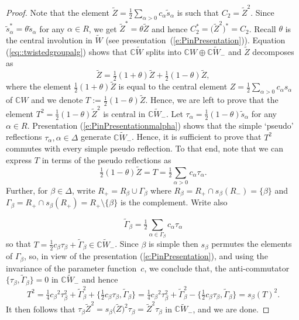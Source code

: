\documentclass[pdftex]{sigma}
\numberwithin{equation}{section}
\begin{document}
\begin{proof}
Note that the element
$\tilde{Z} = \frac{1}{2} \sum_{\alpha >0} c_\alpha \tilde{s}_\alpha$ is such that $C_2 = \tilde{Z}^2$. Since $\tilde{s}_\alpha^* = \theta\tilde{s}_\alpha$ for any $\alpha\in R$, we get $\tilde{Z}^*=\theta\tilde{Z}$ and hence $C_2^* = \big(\tilde{Z}^2\big)^* = C_2$. Recall $\theta$ is the central involution in $\tilde{W}$ (see presentation~(\ref{e:PinPresentation})).
Equation (\ref{eq::twistedgroupalg}) shows that $\mathbb{C}\tilde{W}$ splits into $\mathbb{C}W \oplus \mathbb{C}\tilde{W}_-$ and $\tilde{Z}$ decomposes as
\[\tilde{Z} = \tfrac{1}{2}(1+\theta) \tilde{Z} + \tfrac{1}{2}(1-\theta) \tilde{Z},\]
where the element $ \frac{1}{2}(1
+\theta) \tilde{Z}$ is equal to the central element $Z = \frac{1}{2}\sum_{\alpha >0}c_\alpha s_\alpha$ of $ \mathbb{C}W$ and we denote $T:=\tfrac{1}{2}(1-\theta) \tilde{Z}$. Hence, we are left to prove that the element $T^2= \frac{1}{2}(1-\theta) \tilde{Z}^2$ is central in $\mathbb{C}\tilde{W}_-$. Let $\tau_\alpha = \frac{1}{2}(1-\theta)\tilde{s}_\alpha$ for any $\alpha \in R$. Presentation (\ref{e:PinPresentationmalpha}) shows that the simple `pseudo' reflections $\tau_\alpha, \alpha \in \Delta$ generate $\mathbb{C}\tilde{W}_-$. Hence, it is sufficient to prove that $T^2$ commutes with every simple pseudo reflection. To that end, note that we can express $T$ in terms of the pseudo reflections as
\[\tfrac{1}{2}(1-\theta) \tilde{Z} = T = \tfrac{1}{2}\sum_{\alpha >0} c_\alpha \tau_\alpha.
\]
Further, for $\beta \in \Delta$, write $R_+ = R_\beta \cup \Gamma_\beta$ where $R_\beta = R_+\cap s_\beta(R_-) = \{\beta\}$ and $\Gamma_\beta = R_+\cap s_\beta(R_+) = R_+ \setminus \{\beta\}$ is the complement. Write also

\begin{equation}\label{e:tildeZsums}
\tilde{\Gamma}_\beta = \tfrac{1}{2} \sum_{\alpha \in \Gamma_\beta} c_\alpha \tau_\alpha
\end{equation}
so that $T = \frac{1}{2}c_\beta \tau_\beta + \tilde{\Gamma}_\beta \in \mathbb{C} \tilde{W}_-$.
Since $\beta$ is simple then $s_\beta$ permutes the elements of $\Gamma_\beta$, so, in view of the presentation (\ref{e:PinPresentation}), and using the invariance of the parameter function~$c$, we conclude that, the anti-commutator $\big\{\tau_\beta,\tilde{\Gamma}_\beta\big\}= 0$ in $\mathbb{C}\tilde{W}_-$ and hence
\[
T^2 = \tfrac{1}{4}{c_\beta}^2\tau_\beta^2 + \tilde{\Gamma}_\beta^2 +\big\{\tfrac{1}{2}c_\beta\tau_\beta,\tilde{\Gamma}_\beta\big\}
= \tfrac{1}{4}{c_\beta}^2\tau_\beta^2 + \tilde{\Gamma}_\beta^2 - \big\{\tfrac{1}{2}c_\beta\tau_\beta,\tilde{\Gamma}_\beta\big\}
= s_\beta(T)^2.
\]
It then follows that $\tau_\beta \tilde{Z}^2 = s_\beta\big(\tilde{Z}\big)^2\tau_\beta = \tilde{Z}^2\tau_\beta$ in $\mathbb{C}\tilde{W}_-$, and we are done.
\end{proof}
\end{document}
